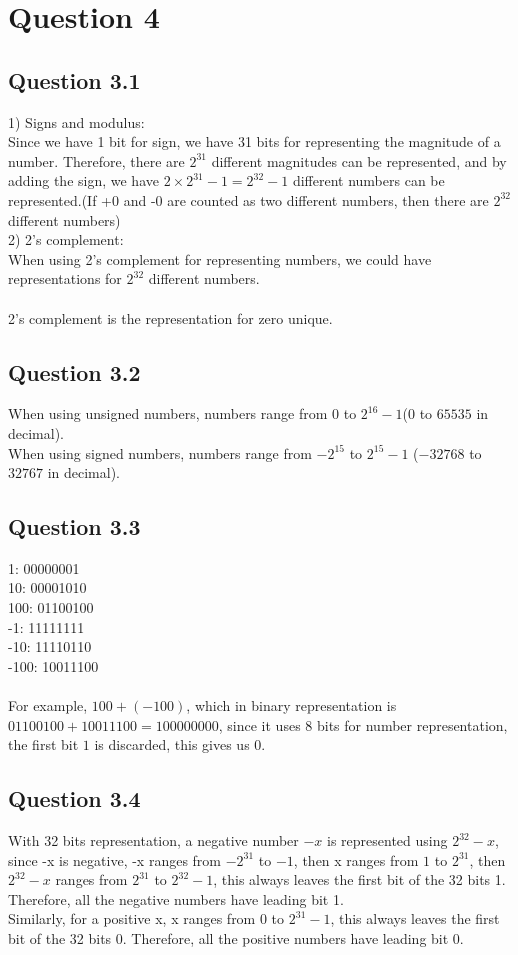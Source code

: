 \documentclass[11pt]{article} %
\begin{document}
\section{Question 4}
\subsection{Question 3.1}
1) Signs and modulus:\\
Since we have 1 bit for sign, we have 31 bits for representing the magnitude of a number. Therefore, there are $2^{31}$ different magnitudes can be represented, and by adding the sign, we have $2\times2^{31}-1 = 2^{32}-1$ different numbers can be represented.(If +0 and -0 are counted as two different numbers, then there are $2^{32}$ different numbers) \\
2) 2's complement:\\ 
When using 2's complement for representing numbers, we could have representations for $2^{32}$ different numbers. \\\\
2's complement is the representation for zero unique.
\subsection{Question 3.2}
When using unsigned numbers, numbers range from $0$ to $2^{16}-1$($0$ to $65535$ in decimal).\\
When using signed numbers, numbers range from $-2^{15}$ to $2^{15}-1$ ($-32768$ to $32767$ in decimal).

\subsection{Question 3.3}
1: 00000001\\
10: 00001010\\
100: 01100100\\
-1: 11111111\\
-10: 11110110\\
-100: 10011100\\\\
For example, $100 + (-100)$, which in binary representation is $01100100+10011100 = 100000000$, since it uses 8 bits for number representation, the first bit $1$ is discarded, this gives us 0.
\subsection{Question 3.4}
With 32 bits representation, a negative number $-x$ is represented using $2^{32}-x$, since -x is negative, -x ranges from $-2^{31}$ to $-1$, then x ranges from $1$ to $2^{31}$, then $2^{32}-x$ ranges from $2^{31}$ to $2^{32}-1$, this always leaves the first bit of the 32 bits 1. Therefore, all the negative numbers have leading bit 1.\\
Similarly, for a positive x, x ranges from $0$ to $2^{31}-1$, this always leaves the first bit of the 32 bits 0. Therefore, all the positive numbers have leading bit 0.
\end{document}
